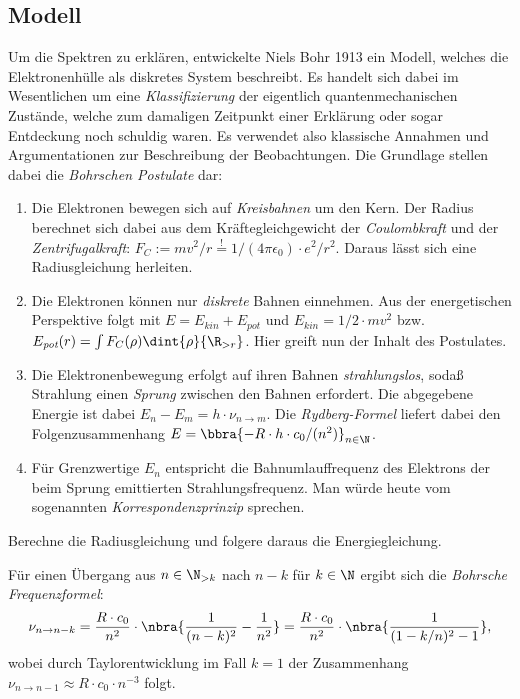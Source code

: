 \documentclass{subfiles}
\begin{document}
    \subsection{Modell}
        Um die Spektren zu erklären, entwickelte Niels Bohr 1913 ein Modell, welches die Elektronenhülle als diskretes System beschreibt. Es handelt sich dabei im Wesentlichen um eine \emph{Klassifizierung} der eigentlich quantenmechanischen Zustände, welche zum damaligen Zeitpunkt einer Erklärung oder sogar Entdeckung noch schuldig waren. Es verwendet also klassische Annahmen und Argumentationen zur Beschreibung der Beobachtungen. Die Grundlage stellen dabei die \emph{Bohrschen Postulate} dar:
        \begin{enumerate}[label=(\roman*)]
            \item Die Elektronen bewegen sich auf \emph{Kreisbahnen} um den Kern. Der Radius berechnet sich dabei aus dem Kräftegleichgewicht der \emph{Coulombkraft} und der \emph{Zentrifugalkraft}: $F_C := mv^2/r \stackrel{!}{=} 1/(4\pi\epsilon_0)\cdot e^2/r^2$. Daraus lässt sich eine Radiusgleichung herleiten. 
            \item Die Elektronen können nur \emph{diskrete} Bahnen einnehmen. Aus der energetischen Perspektive folgt mit $E = E_\textit{kin} + E_\textit{pot}$ und $E_\textit{kin} = 1/2\cdot mv^2$ bzw. $E_\textit{pot}(r) = \int F_{C}(\rho)\dint{\rho}{\R_{>r}}$. Hier greift nun der Inhalt des Postulates. 
            \item Die Elektronenbewegung erfolgt auf ihren Bahnen \emph{strahlungslos}, sodaß Strahlung einen \emph{Sprung} zwischen den Bahnen erfordert. Die abgegebene Energie ist dabei $E_n-E_m = h\cdot \nu_{n\to m}$. Die \emph{Rydberg-Formel} liefert dabei den Folgenzusammenhang $E = \bbra{-R\cdot h\cdot c_0/(n^2)}_{n\in\N}$. 
            \item Für Grenzwertige $E_n$ entspricht die Bahnumlauffrequenz des Elektrons der beim Sprung emittierten Strahlungsfrequenz. Man würde heute vom sogenannten \emph{Korrespondenzprinzip} sprechen. 
        \end{enumerate}

        \begin{Aufgabe}
            \nr{} Berechne die Radiusgleichung und folgere daraus die Energiegleichung. 
        \end{Aufgabe}

        Für einen Übergang aus $n\in\N_{>k}$ nach $n-k$ für $k\in\N$ ergibt sich die \emph{Bohrsche Frequenzformel}:
        \[\nu_{n\to n-k} = \frac{R\cdot c_0}{n^2}\cdot\nbra{\frac{1}{(n-k)^2} - \frac{1}{n^2}} = \frac{R\cdot c_0}{n^2}\cdot\nbra{\frac{1}{(1-k/n)^2 - 1}},\]
        wobei durch Taylorentwicklung im Fall $k = 1$ der Zusammenhang $\nu_{n\to n-1} \approx R\cdot c_0\cdot n^{-3}$ folgt. 
        
\end{document}
